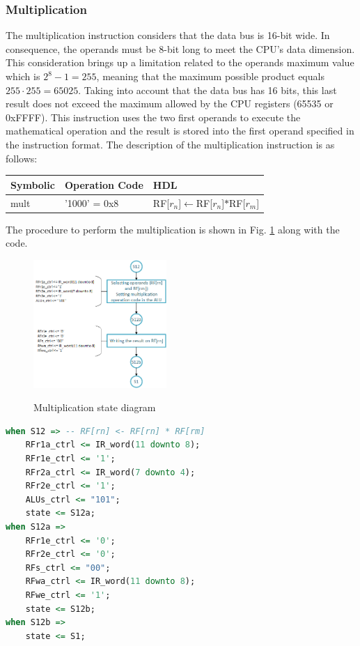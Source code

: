 \documentclass[]{article}
\begin{document}
\subsubsection{Multiplication}
The multiplication instruction considers that the data bus is 16-bit wide. In consequence, the operands must be 8-bit long to meet the CPU's data dimension. This consideration brings up a limitation related to the operands maximum value which is $2^{8}-1 = 255$, meaning that the maximum possible product equals $255\cdot 255 = 65025$. Taking into account that the data bus has 16 bits, this last result does not exceed the maximum allowed by the CPU registers (65535 or 0xFFFF). This instruction uses the two first operands to execute the mathematical operation and the result is stored into the first operand specified in the instruction format. The description of the multiplication instruction is as follows:

\begin{table}[h]
	\centering
	{
		\begin{tabular}{|p{3cm}|p{3cm}|p{3.2cm}|}
			\hline
			\textbf{Symbolic} & \textbf{Operation Code} & \textbf{HDL} \\
			\hline
			mult & '1000' = 0x8 & RF[$r_n$]$\leftarrow$RF[$r_n$]$*$RF[$r_m$]\\
			\hline
		\end{tabular}
	}
\end{table}

The procedure to perform the multiplication is shown in Fig. \ref{fig:1} along with the code.
\begin{figure}[H]
	\caption{Multiplication state diagram}
	\centering
	\includegraphics[width=0.45\textwidth]{mult}
	\label{fig:1}
\end{figure}

\begin{lstlisting}[language=vhdl, caption={Multiplication state vhdl}, label={}]
when S12 =>	-- RF[rn] <- RF[rn] * RF[rm]
	RFr1a_ctrl <= IR_word(11 downto 8);	
	RFr1e_ctrl <= '1'; 
	RFr2a_ctrl <= IR_word(7 downto 4);
	RFr2e_ctrl <= '1';  
	ALUs_ctrl <= "101";
	state <= S12a;
when S12a =>   
	RFr1e_ctrl <= '0';
	RFr2e_ctrl <= '0';
	RFs_ctrl <= "00";
	RFwa_ctrl <= IR_word(11 downto 8);
	RFwe_ctrl <= '1';
	state <= S12b;
when S12b =>  
	state <= S1;	
\end{lstlisting}
\end{document}

